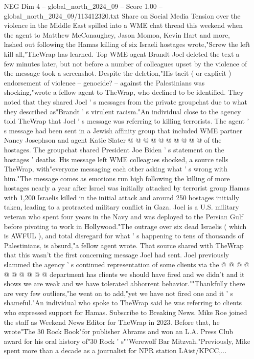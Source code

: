 \begin{textsample}{NEG Dim 4 – global\_north\_2024\_09 – Score 1.00 – global\_north\_2024\_09/113412320.txt}  \label{ex:f4_neg_147}
Share on Social Media Tension over the violence in the Middle East spilled into a WME chat thread this weekend when the agent to Matthew McConaughey, Jason Momoa, Kevin Hart and more, lashed out following the Hamas killing of six Israeli hostages wrote,"Screw the left kill all,"TheWrap has learned.
Top WME agent Brandt Joel deleted the text a few minutes later, but not before a number of colleagues upset by the violence of the message took a screenshot.
Despite the deletion,"His tacit ( or explicit ) endorsement of violence -- genocide? -- against the Palestinians was shocking,"wrote a fellow agent to TheWrap, who declined to be identified.
They noted that they shared Joel ' s messages from the private groupchat due to what they described as"Brandt ' s virulent racism."An individual close to the agency told TheWrap that Joel ' s message was referring to killing terrorists.
The agent ' s message had been sent in a Jewish affinity group that included WME partner Nancy Josephson and agent Katie Slater @ @ @ @ @ @ @ @ @ @ of the hostages.
The groupchat shared President Joe Biden ' s statement on the hostages ' deaths.
His message left WME colleagues shocked, a source tells TheWrap, with"everyone messaging each other asking what ' s wrong with him."The message comes as emotions run high following the killing of more hostages nearly a year after Israel was initially attacked by terrorist group Hamas with 1,200 Israelis killed in the initial attack and around 250 hostages initially taken, leading to a protracted military conflict in Gaza.
Joel is a U.S. military veteran who spent four years in the Navy and was deployed to the Persian Gulf before pivoting to work in Hollywood."The outrage over six dead Israelis ( which is AWFUL ), and total disregard for what ' s happening to tens of thousands of Palestinians, is absurd,"a fellow agent wrote.
That source shared with TheWrap that this wasn't the first concerning message Joel had sent.
Joel previously slammed the agency ' s continued representation of some clients via the @ @ @ @ @ @ @ @ @ @ department has clients we should have fired and we didn't and it shows we are weak and we have tolerated abhorrent behavior.""Thankfully there are very few outliers,"he went on to add,"yet we have not fired one and it ' s shameful."An individual who spoke to TheWrap said he was referring to clients who expressed support for Hamas.
Subscribe to Breaking News.
Mike Roe joined the staff as Weekend News Editor for TheWrap in 2023.
Before that, he wrote"The 30 Rock Book"for publisher Abrams and won an L.A.
Press Club award for his oral history of"30 Rock ' s""Werewolf Bar Mitzvah."Previously, Mike spent more than a decade as a journalist for NPR station LAist/KPCC,...

\end{textsample}
